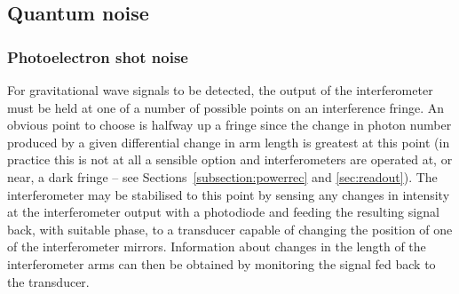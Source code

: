 \documentclass{article}
\begin{document}

\subsection{Quantum noise}
\label{subsection:quantumnoise}

\subsubsection{Photoelectron shot noise}
\label{subsubsection:shotnoise}

For gravitational wave signals to be detected, the output of the interferometer
must be held at one of a number of possible points on an interference fringe. An
obvious point to choose is halfway up a fringe since the change in photon number
produced by a given differential change in arm length is greatest at this
point (in practice this is not at all a sensible option and interferometers
are operated at, or near, a dark fringe -- see
Sections~\ref{subsection:powerrec} and \ref{sec:readout}). The interferometer may be stabilised to this point by sensing
any changes in intensity at the interferometer output with a photodiode and
feeding the resulting signal back, with suitable phase, to a transducer capable
of changing the position of one of the interferometer mirrors.  Information
about changes in the length of the interferometer arms can then be obtained by
monitoring the signal fed back to the transducer.
\end{document}
